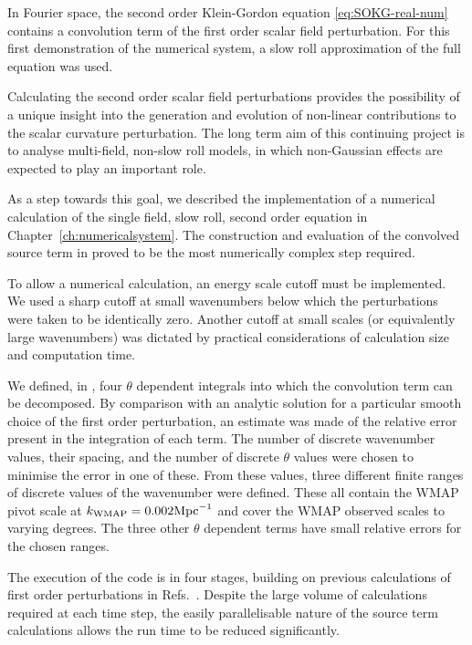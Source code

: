 In Fourier space, the second order Klein-Gordon equation \eqref{eq:SOKG-real-num} contains a
convolution term of the first order scalar field perturbation. For this first
demonstration of the numerical system, a slow roll approximation of the full
equation was used. 

Calculating the second order scalar field perturbations provides the possibility of
a unique insight into the generation and evolution of non-linear contributions to
the scalar curvature perturbation. The long term aim of this continuing project is
to analyse multi-field, non-slow roll models, in which non-Gaussian effects are
expected to play an important role.

As a step towards this goal, we described the implementation of a numerical
calculation of the single field, slow roll, second order equation in
Chapter~\ref{ch:numericalsystem}. The construction and evaluation of the convolved
source term in  proved to be the most numerically complex
step required. 

To allow a numerical calculation, an energy scale cutoff must be implemented. We used
a sharp cutoff at small wavenumbers below which the perturbations were taken to be
identically zero. Another cutoff at small scales (or equivalently large wavenumbers) was dictated
by practical considerations of calculation size and computation time.

We defined, in , four $\theta$ dependent integrals
into which the convolution term can be decomposed. By comparison with an analytic
solution for a particular smooth choice of the first order perturbation, an estimate
was made of the relative error present in the integration of each term. The
number of discrete wavenumber values, their spacing, and the number of discrete
$\theta$ values were chosen to minimise the error in one of these. From these values, three
different finite ranges of discrete values of the wavenumber were defined.
These all contain the WMAP pivot scale at $k_\mathrm{WMAP}=0.002\mathrm{Mpc}^{-1}$ and cover the
WMAP observed scales to varying degrees.
% 
The three other $\theta$ dependent terms have small relative errors for the chosen
ranges. 



The execution of the code is in four stages, building on previous calculations of
first order perturbations in Refs.~\cite{Martin:2006rs, Ringeval:2007am, Salopek:1988qh}. Despite
the large volume of calculations required at each
time step, the easily parallelisable nature of the source term calculations allows
the run time to be reduced significantly.


